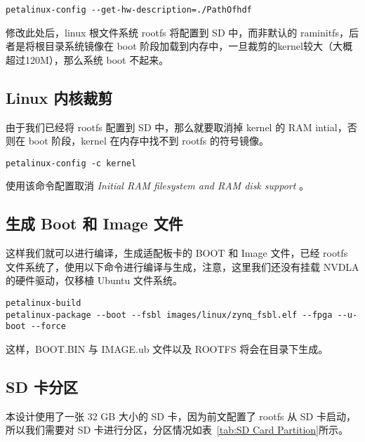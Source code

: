\begin{lstlisting}
petalinux-config --get-hw-description=./PathOfhdf
\end{lstlisting}

修改此处后，linux 根文件系统 rootfs 将配置到 SD 中，而非默认的  raminitfs，后者是将根目录系统镜像在 boot 阶段加载到内存中，一旦裁剪的kernel较大（大概超过120M），那么系统 boot 不起来。

\subsection{Linux 内核裁剪}

由于我们已经将 rootfs 配置到 SD 中，那么就要取消掉 kernel 的 RAM intial，否则在 boot 阶段，kernel 在内存中找不到 rootfs 的符号镜像。

\begin{lstlisting}
petalinux-config -c kernel
\end{lstlisting}

使用该命令配置取消 \emph{Initial RAM filesystem and RAM disk support} 。

\subsection{生成 Boot 和 Image 文件}

这样我们就可以进行编译，生成适配板卡的 BOOT 和 Image 文件，已经 rootfs 文件系统了，使用以下命令进行编译与生成，注意，这里我们还没有挂载 NVDLA 的硬件驱动，仅移植 Ubuntu 文件系统。

\begin{lstlisting}
petalinux-build
petalinux-package --boot --fsbl images/linux/zynq_fsbl.elf --fpga --u-boot --force
\end{lstlisting}

这样，BOOT.BIN 与 IMAGE.ub 文件以及 ROOTFS 将会在目录下生成。

\subsection{SD 卡分区}

本设计使用了一张 32 GB 大小的 SD 卡，因为前文配置了 rootfs 从 SD 卡启动，所以我们需要对 SD 卡进行分区，分区情况如表~\ref{tab:SD Card Partition}所示。

